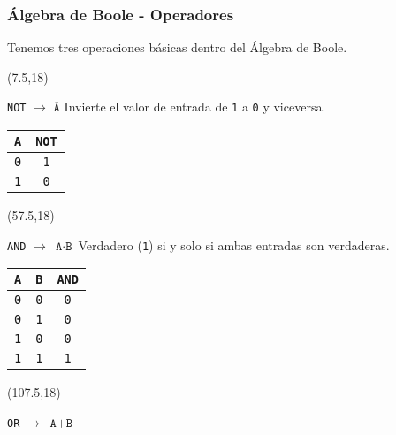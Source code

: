 \documentclass[aspectratio=169]{beamer}
\begin{document}
\begin{frame}[fragile,t]
    \frametitle{Álgebra de Boole - Operadores}
    Tenemos tres operaciones básicas dentro del Álgebra de Boole.\\
    \begin{textblock}{45}(7.5,18)
    \begin{block}{\texttt{NOT} $\rightarrow$ \Large \textcolor{naranjauca}{ $\overline{\texttt{A}}$ }}
     Invierte el valor de entrada de \texttt{1} a \texttt{0} y viceversa.
    \vspace{0.98cm} %
    \begin{center}
    \begin{tabular}{c|c}
    \texttt{A} & \texttt{NOT} \\
    \hline
    \texttt{0} & \texttt{1} \\
    \texttt{1} & \texttt{0} \\
    \end{tabular}
    \end{center}
    \vspace{0.28cm} %
    \end{block}
    \end{textblock}    
    \begin{textblock}{45}(57.5,18)
    \begin{block}{\texttt{AND} $\rightarrow$ \Large \textcolor{naranjauca}{ $\texttt{A}\cdot\texttt{B}$ }}
    Verdadero (\texttt{1}) si y solo si ambas entradas son verdaderas. %
    \begin{center}
    \begin{tabular}{cc|c}
    \texttt{A} & \texttt{B} & \texttt{AND} \\
    \hline
    \texttt{0} & \texttt{0} & \texttt{0} \\
    \texttt{0} & \texttt{1} & \texttt{0} \\
    \texttt{1} & \texttt{0} & \texttt{0} \\
    \texttt{1} & \texttt{1} & \texttt{1} \\
    \end{tabular}
    \end{center}
    \end{block}
    \vspace{0cm} %
    \end{textblock}
    \begin{textblock}{45}(107.5,18)
    \begin{block}{\texttt{OR} $\rightarrow$ \Large \textcolor{naranjauca}{ $\texttt{A}+\texttt{B}$ }}

\end{block}
\end{textblock}
\end{frame}
\end{document}
